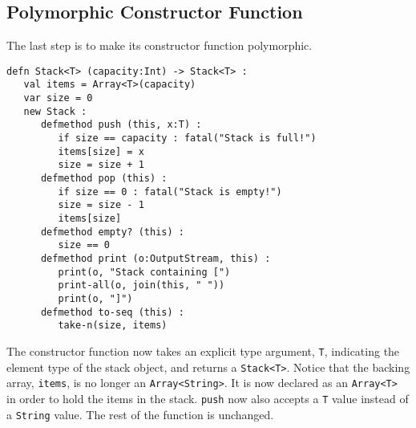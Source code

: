\documentclass[10pt,oneside]{book}
\begin{document}
\subsection*{Polymorphic Constructor Function}
The last step is to make its constructor function polymorphic.
\begin{lstlisting}
defn Stack<T> (capacity:Int) -> Stack<T> :
   val items = Array<T>(capacity)
   var size = 0
   new Stack :
      defmethod push (this, x:T) :
         if size == capacity : fatal("Stack is full!")
         items[size] = x
         size = size + 1
      defmethod pop (this) :
         if size == 0 : fatal("Stack is empty!")
         size = size - 1
         items[size]
      defmethod empty? (this) :
         size == 0
      defmethod print (o:OutputStream, this) :
         print(o, "Stack containing [")
         print-all(o, join(this, " "))
         print(o, "]")
      defmethod to-seq (this) :
         take-n(size, items)
\end{lstlisting}
The constructor function now takes an explicit type argument, \texttt{\frenchspacing T}, indicating the element type of the stack object, and returns a \texttt{\frenchspacing Stack<T>}. Notice that the backing array, \texttt{\frenchspacing items}, is no longer an \texttt{\frenchspacing Array<String>}. It is now declared as an \texttt{\frenchspacing Array<T>} in order to hold the items in the stack. \texttt{\frenchspacing push} now also accepts a \texttt{\frenchspacing T} value instead of a \texttt{\frenchspacing String} value. The rest of the function is unchanged. 
\end{document}
